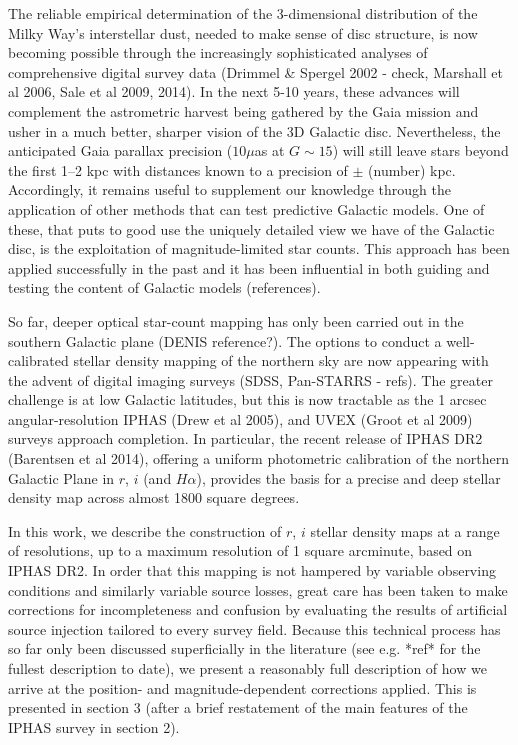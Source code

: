 \documentclass[a4paper,useAMS,usenatbib]{mn2e}
\begin{document}
The reliable empirical determination of the 3-dimensional distribution of the Milky 
Way's interstellar dust, needed to make sense of disc structure, is now becoming possible 
through the increasingly sophisticated analyses of comprehensive digital survey data 
(Drimmel \& Spergel 2002 - check, Marshall et al 2006, Sale et al 2009, 2014).  In the
next 5-10 years, these advances will complement the astrometric harvest being gathered 
by the Gaia mission and usher in a much better, sharper vision of the 3D Galactic disc.
Nevertheless, the anticipated Gaia parallax precision ($10\mu$as at $G \sim 15$) will 
still leave stars beyond the first 1--2 kpc with distances known to a precision of $\pm$
(number) kpc.  Accordingly, it remains useful to supplement our knowledge through the 
application of other methods that can test predictive Galactic models.  One of these, 
that puts to good use the uniquely detailed view we have of the Galactic disc,
is the exploitation of magnitude-limited star counts.  This approach has been applied 
successfully in the past and it has been influential in both guiding and 
testing the content of Galactic models (references).  

So far, deeper optical star-count mapping has only been carried out in the 
southern Galactic plane (DENIS reference?).  The options to conduct a 
well-calibrated stellar density mapping of the northern sky are now 
appearing with the advent of digital imaging surveys (SDSS, Pan-STARRS - 
refs).  The greater challenge is at low Galactic latitudes, but this is now 
tractable as the 1 arcsec angular-resolution IPHAS (Drew et al 2005), and 
UVEX (Groot et al 2009) surveys approach completion.  In particular, the 
recent release of IPHAS DR2 (Barentsen et al 2014), offering a uniform 
photometric calibration of the northern Galactic Plane in $r$, $i$ (and 
$H\alpha$), provides the basis for a precise and deep stellar density map 
across almost 1800 square degrees.

In this work, we describe the construction of $r$, $i$ stellar density maps at
a range of resolutions, up to a maximum resolution of 1 square arcminute, 
based on IPHAS DR2.  In order that this mapping is not hampered by variable 
observing conditions and similarly variable source losses, great care has been 
taken to make corrections for incompleteness and confusion by evaluating the 
results of artificial source injection tailored to every survey field. Because 
this technical process has so far only been discussed superficially in the 
literature (see e.g. *ref* for the fullest description to date), we present a 
reasonably full description of how we arrive at the position- and 
magnitude-dependent corrections applied.  This is presented in section 3 (after
a brief restatement of the main features of the IPHAS survey in section 2).
\end{document}
